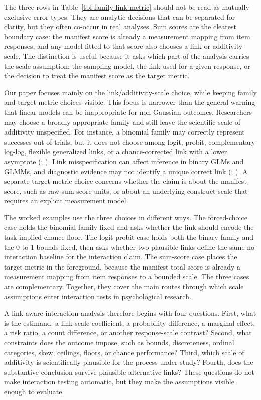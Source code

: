 \documentclass[
  man,
  longtable,
  nolmodern,
  notxfonts,
  notimes,
  colorlinks=true,linkcolor=blue,citecolor=blue,urlcolor=blue]{apa7}
\begin{document}
The three rows in Table~\ref{tbl-family-link-metric} should not be read
as mutually exclusive error types. They are analytic decisions that can
be separated for clarity, but they often co-occur in real analyses. Sum
scores are the clearest boundary case: the manifest score is already a
measurement mapping from item responses, and any model fitted to that
score also chooses a link or additivity scale. The distinction is useful
because it asks which part of the analysis carries the scale assumption:
the sampling model, the link used for a given response, or the decision
to treat the manifest score as the target metric.

Our paper focuses mainly on the link/additivity-scale choice, while
keeping family and target-metric choices visible. This focus is narrower
than the general warning that linear models can be inappropriate for
non-Gaussian outcomes. Researchers may choose a broadly appropriate
family and still leave the scientific scale of additivity unspecified.
For instance, a binomial family may correctly represent successes out of
trials, but it does not choose among logit, probit, complementary
log-log, flexible generalized links, or a chance-corrected link with a
lower asymptote (;
). Link misspecification can
affect inference in binary GLMs and GLMMs, and diagnostic evidence may
not identify a unique correct link
(;
). A separate target-metric
choice concerns whether the claim is about the manifest score, such as
raw sum-score units, or about an underlying construct scale that
requires an explicit measurement model.

The worked examples use the three choices in different ways. The
forced-choice case holds the binomial family fixed and asks whether the
link should encode the task-implied chance floor. The logit-probit case
holds both the binary family and the 0-to-1 bounds fixed, then asks
whether two plausible links define the same no-interaction baseline for
the interaction claim. The sum-score case places the target metric in
the foreground, because the manifest total score is already a
measurement mapping from item responses to a bounded scale. The three
cases are complementary. Together, they cover the main routes through
which scale assumptions enter interaction tests in psychological
research.

A link-aware interaction analysis therefore begins with four questions.
First, what is the estimand: a link-scale coefficient, a probability
difference, a marginal effect, a risk ratio, a count difference, or
another response-scale contrast? Second, what constraints does the
outcome impose, such as bounds, discreteness, ordinal categories, skew,
ceilings, floors, or chance performance? Third, which scale of
additivity is scientifically plausible for the process under study?
Fourth, does the substantive conclusion survive plausible alternative
links? These questions do not make interaction testing automatic, but
they make the assumptions visible enough to evaluate.
\end{document}
